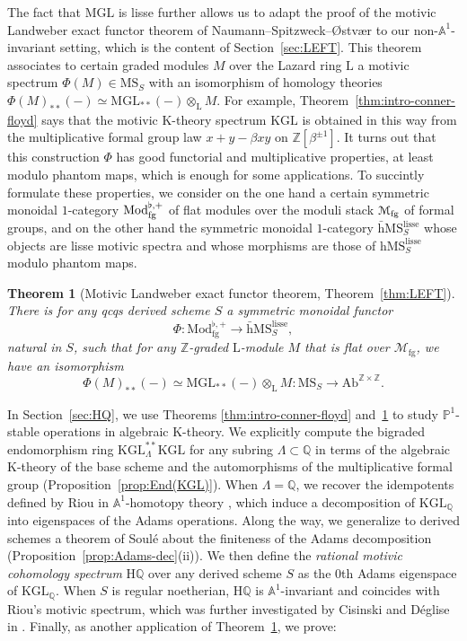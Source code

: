 \documentclass{amsart}
\numberwithin{equation}{section}
\theoremstyle{plain}
\newtheorem{theorem}[equation]{Theorem}
\theoremstyle{definition}
\let\scr=\mathcal
\let\bb=\mathbb
\def\Z{\bb Z}
\def\Q{\bb Q}
\def\A{\bb A}
\def\P{\bb P}
\def\h{\mathrm h}
\def\ph{\mathord-}
\def\L{\mathrm{L}{}}
\def\HH{\mathrm{H}}
\let\cat=\mathrm
\def\MGL{\mathrm{MGL}}
\def\KGL{\mathrm{KGL}}
\def\Mod{\cat{M}\mathrm{od}{}}
\def\MS{\mathrm{MS}}
\def\Ab{\mathrm{A}\mathrm{b}}
\def\w{\bar{\mathrm{h}}}
\def\fg{\mathrm{fg}}
\def\lisse{\mathrm{lisse}}
\begin{document}
The fact that $\MGL$ is lisse further allows us to adapt the proof of the motivic Landweber exact functor theorem of Naumann–Spitzweck–Østvær \cite{Naumann:2009} to our non-$\A^1$-invariant setting, which is the content of Section~\ref{sec:LEFT}. This theorem associates to certain graded modules $M$ over the Lazard ring $\L$ a motivic spectrum $\Phi(M)\in\MS_S$ with an isomorphism of homology theories $\Phi(M)_{**}(\ph)\simeq \MGL_{**}(\ph)\otimes_\L M$.
For example, Theorem~\ref{thm:intro-conner-floyd} says that the motivic K-theory spectrum $\KGL$ is obtained in this way from the multiplicative formal group law $x+y-\beta xy$ on $\Z[\beta^{\pm 1}]$. It turns out that this construction $\Phi$ has good functorial and multiplicative properties, at least modulo phantom maps, which is enough for some applications.
To succintly formulate these properties, we consider on the one hand a certain symmetric monoidal $1$-category $\Mod_{\smash[b]{\fg}}^{\flat,+}$ of flat modules over the moduli stack $\scr M_{\smash[b]{\fg}}$ of formal groups, and on the other hand the symmetric monoidal $1$-category $\w\MS_S^\lisse$ whose objects are lisse motivic spectra and whose morphisms are those of $\h\MS_S^\lisse$ modulo phantom maps.

\begin{theorem}[Motivic Landweber exact functor theorem, Theorem~\ref{thm:LEFT}]
	\label{thm:intro-LEFT}
	There is for any qcqs derived scheme $S$ a symmetric monoidal functor
	\[
	\Phi\colon \Mod_\fg^{\flat,+}\to \w\MS_S^\lisse,
	\]
	natural in $S$, such that for any $\Z$-graded $\L$-module $M$ that is flat over $\scr M_\fg$, we have an isomorphism
	\[
	\Phi(M)_{**}(\ph)\simeq \MGL_{**}(\ph)\otimes_\L M\colon \MS_S\to \Ab^{\Z\times\Z}.
	\]
\end{theorem}

In Section~\ref{sec:HQ}, we use Theorems \ref{thm:intro-conner-floyd} and~\ref{thm:intro-LEFT} to study $\P^1$-stable operations in algebraic K-theory. We explicitly compute the bigraded endomorphism ring $\KGL^{**}_\Lambda\KGL$ for any subring $\Lambda\subset\Q$ in terms of the algebraic K-theory of the base scheme and the automorphisms of the multiplicative formal group (Proposition~\ref{prop:End(KGL)}). When $\Lambda=\Q$, we recover the idempotents defined by Riou in $\A^1$-homotopy theory \cite[Section 5]{RiouK}, which induce a decomposition of $\KGL_\Q$ into eigenspaces of the Adams operations. Along the way, we generalize to derived schemes a theorem of Soulé about the finiteness of the Adams decomposition (Proposition~\ref{prop:Adams-dec}(ii)). 
We then define the \emph{rational motivic cohomology spectrum} $\HH\Q$ over any derived scheme $S$ as the $0$th Adams eigenspace of $\KGL_\Q$.
When $S$ is regular noetherian, $\HH\Q$ is $\A^1$-invariant and coincides with Riou's motivic spectrum, which was further investigated by Cisinski and Déglise in \cite[Section 14]{CD}.
Finally, as another application of Theorem~\ref{thm:intro-LEFT}, we prove:
\end{document}
